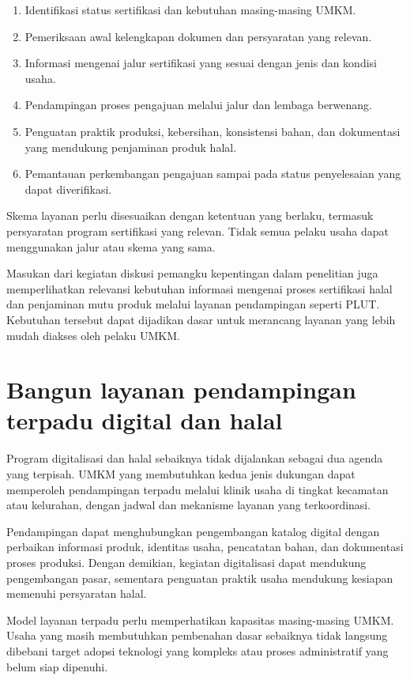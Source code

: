 \documentclass[
  indonesian,
  11pt,
  a4paper,
]{report}
\providecommand{\tightlist}{%
  \setlength{\itemsep}{0pt}\setlength{\parskip}{0pt}}
\begin{document}
\begin{enumerate}
\def\labelenumi{\arabic{enumi}.}
\tightlist
\item
  Identifikasi status sertifikasi dan kebutuhan masing-masing UMKM.
\item
  Pemeriksaan awal kelengkapan dokumen dan persyaratan yang relevan.
\item
  Informasi mengenai jalur sertifikasi yang sesuai dengan jenis dan
  kondisi usaha.
\item
  Pendampingan proses pengajuan melalui jalur dan lembaga berwenang.
\item
  Penguatan praktik produksi, kebersihan, konsistensi bahan, dan
  dokumentasi yang mendukung penjaminan produk halal.
\item
  Pemantauan perkembangan pengajuan sampai pada status penyelesaian yang
  dapat diverifikasi.
\end{enumerate}

Skema layanan perlu disesuaikan dengan ketentuan yang berlaku, termasuk
persyaratan program sertifikasi yang relevan. Tidak semua pelaku usaha
dapat menggunakan jalur atau skema yang sama.

Masukan dari kegiatan diskusi pemangku kepentingan dalam penelitian juga
memperlihatkan relevansi kebutuhan informasi mengenai proses sertifikasi
halal dan penjaminan mutu produk melalui layanan pendampingan seperti
PLUT. Kebutuhan tersebut dapat dijadikan dasar untuk merancang layanan
yang lebih mudah diakses oleh pelaku UMKM.

\section*{Bangun layanan pendampingan terpadu digital dan
halal}\label{bangun-layanan-pendampingan-terpadu-digital-dan-halal}

Program digitalisasi dan halal sebaiknya tidak dijalankan sebagai dua
agenda yang terpisah. UMKM yang membutuhkan kedua jenis dukungan dapat
memperoleh pendampingan terpadu melalui klinik usaha di tingkat
kecamatan atau kelurahan, dengan jadwal dan mekanisme layanan yang
terkoordinasi.

Pendampingan dapat menghubungkan pengembangan katalog digital dengan
perbaikan informasi produk, identitas usaha, pencatatan bahan, dan
dokumentasi proses produksi. Dengan demikian, kegiatan digitalisasi
dapat mendukung pengembangan pasar, sementara penguatan praktik usaha
mendukung kesiapan memenuhi persyaratan halal.

Model layanan terpadu perlu memperhatikan kapasitas masing-masing UMKM.
Usaha yang masih membutuhkan pembenahan dasar sebaiknya tidak langsung
dibebani target adopsi teknologi yang kompleks atau proses administratif
yang belum siap dipenuhi.
\end{document}
